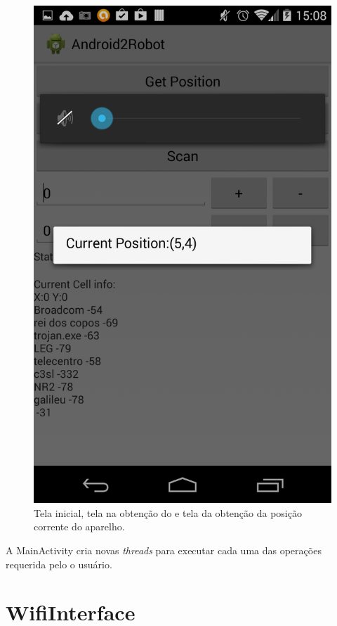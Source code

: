 \begin{figure}[hbt]
  \includegraphics[scale=0.23]{images/tela3.png}
  \caption{Tela inicial, tela na obtenção do  e 
  tela da obtenção da posição corrente do aparelho.}
  \label{fig:app}
  \end{figure}
  \clearpage
  A MainActivity cria novas \textit{threads} para executar cada uma das operações requerida pelo o usuário.
  
  \section{WifiInterface}
  
